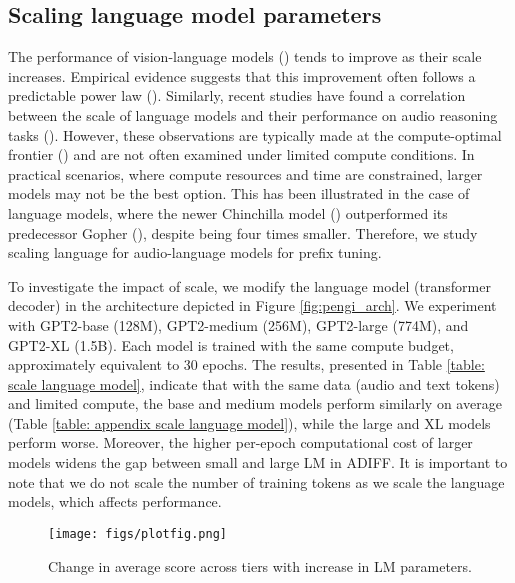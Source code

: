 \subsection{Scaling language model parameters} \label{subsec: scaling of language model} \vspace{-0.1in}
The performance of vision-language models (\cite{alabdulmohsin2024getting}) tends to improve as their scale increases. Empirical evidence suggests that this improvement often follows a predictable power law (\cite{kaplan2020scaling}). Similarly, recent studies have found a correlation between the scale of language models and their performance on audio reasoning tasks (\cite{audioentail}). However, these observations are typically made at the compute-optimal frontier (\cite{hoffmann2022training}) and are not often examined under limited compute conditions. In practical scenarios, where compute resources and time are constrained, larger models may not be the best option. This has been illustrated in the case of language models, where the newer Chinchilla model (\cite{hoffmann2022training}) outperformed its predecessor Gopher (\cite{rae2021scaling}), despite being four times smaller. Therefore, we study scaling language for audio-language models for prefix tuning. 

To investigate the impact of scale, we modify the language model (transformer decoder) in the architecture depicted in Figure \ref{fig:pengi_arch}. We experiment with GPT2-base (128M), GPT2-medium (256M), GPT2-large (774M), and GPT2-XL (1.5B). Each model is trained with the same compute budget, approximately equivalent to 30 epochs. The results, presented in Table \ref{table: scale language model}, indicate that with the same data (audio and text tokens) and limited compute, the base and medium models perform similarly on average (Table \ref{table: appendix scale language model}), while the large and XL models perform worse. Moreover, the higher per-epoch computational cost of larger models widens the gap between small and large LM in ADIFF. It is important to note that we do not scale the number of training tokens as we scale the language models, which affects performance. 

\begin{wrapfigure}[11]{r}{0.40\textwidth}
\begin{center}
     \vspace{-0.2in}
     \texttt{[image: figs/plotfig.png]}
     \caption{\small Change in average score across tiers with increase in LM parameters.
     }
     \label{fig:scale}
\end{center}
\end{wrapfigure}

